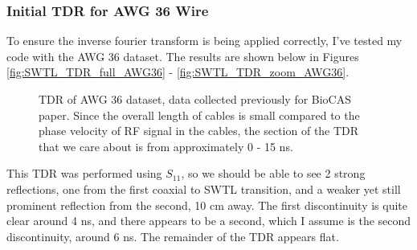 \documentclass[12pt,onecolumn,titlepage]{article}
\begin{document}
\subsubsection{Initial TDR for AWG 36 Wire}
\indent \indent To ensure the inverse fourier transform is being applied correctly, I've tested my code with the AWG 36 dataset. The results are shown below in Figures \ref{fig:SWTL_TDR_full_AWG36} - \ref{fig:SWTL_TDR_zoom_AWG36}.


\begin{figure}[htbp]
	\centering
		\quad
	\label{fig:SWTL_TDR_AWG36}
	\caption{TDR of AWG 36 dataset, data collected previously for BioCAS paper. Since the overall length of cables is small compared to the phase velocity of RF signal in the cables, the section of the TDR that we care about is from approximately 0 - 15 ns.}
\end{figure}

This TDR was performed using $S_{11}$, so we should be able to see 2 strong reflections, one from the first coaxial to SWTL transition, and a weaker yet still prominent reflection from the second, 10 cm away. The first discontinuity is quite clear around 4 ns, and there appears to be a second, which I assume is the second discontinuity, around 6 ns. The remainder of the TDR appears flat.
\end{document}
